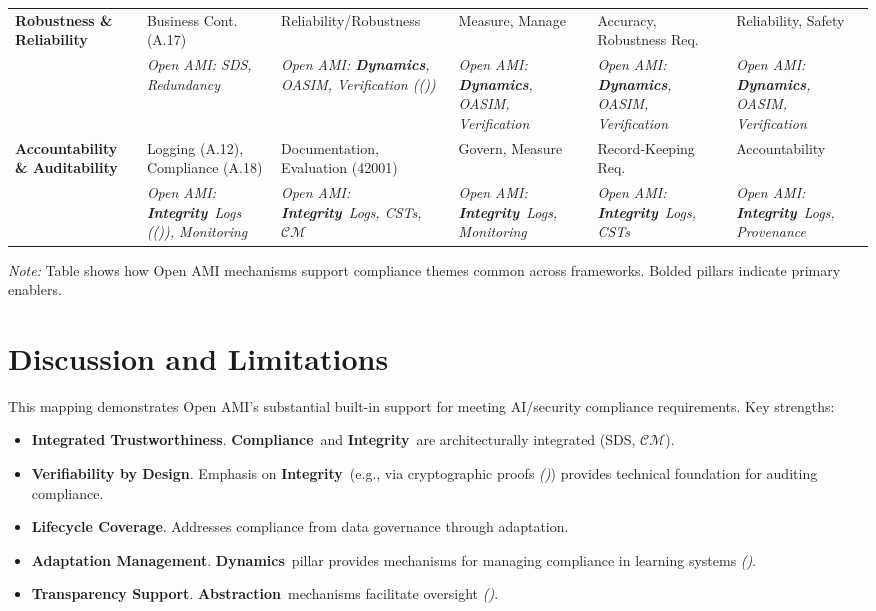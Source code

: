 \documentclass[12pt,a4paper]{report}
\renewcommand{\citep}[1]{\textit{\scriptsize{(\cite{#1})}}}
\newcommand{\Compliance}{\textbf{Compliance}}
\newcommand{\Integrity}{\textbf{Integrity}}
\newcommand{\Abstraction}{\textbf{Abstraction}}
\newcommand{\Dynamics}{\textbf{Dynamics}}
\begin{document}
\begin{table}[htbp]
{\begin{tabular}{p{2.5cm}|p{2.5cm}|p{2.5cm}|p{2.5cm}|p{2.5cm}|p{2.5cm}@{}}
				\midrule
				\textbf{Robustness \& Reliability} & \scriptsize Business Cont. (A.17) & \scriptsize Reliability/Robustness & \scriptsize Measure, Manage & \scriptsize Accuracy, Robustness Req. & \scriptsize Reliability, Safety \\
				& \textit{\scriptsize Open AMI: SDS, Redundancy} & \textit{\scriptsize Open AMI: \Dynamics, OASIM, Verification (\citep{AdditionalCitationRef53})} & \textit{\scriptsize Open AMI: \Dynamics, OASIM, Verification} & \textit{\scriptsize Open AMI: \Dynamics, OASIM, Verification} & \textit{\scriptsize Open AMI: \Dynamics, OASIM, Verification} \\
				\midrule
				\textbf{Accountability \& Auditability} & \scriptsize Logging (A.12), Compliance (A.18) & \scriptsize Documentation, Evaluation (42001) & \scriptsize Govern, Measure & \scriptsize Record-Keeping Req. & \scriptsize Accountability \\
				& \textit{\scriptsize Open AMI: \Integrity\ Logs (\citep{ProML_Provenance_2022}), Monitoring} & \textit{\scriptsize Open AMI: \Integrity\ Logs, CSTs, $\mathcal{CM}$} & \textit{\scriptsize Open AMI: \Integrity\ Logs, Monitoring} & \textit{\scriptsize Open AMI: \Integrity\ Logs, CSTs} & \textit{\scriptsize Open AMI: \Integrity\ Logs, Provenance} \\
				\bottomrule
			\end{tabular}
		} %
		\vspace{0.5ex}
		\centerline{\textit{Note:} Table shows how Open AMI mechanisms support compliance themes common across frameworks. Bolded pillars indicate primary enablers.}
	\end{table}
	
	\section{Discussion and Limitations}
	\label{app:compmap_discussion}
	
	This mapping demonstrates Open AMI's substantial built-in support for meeting AI/security compliance requirements. Key strengths:
	
	\begin{itemize}
		\item \textbf{Integrated Trustworthiness}. \Compliance\ and \Integrity\ are architecturally integrated (SDS, $\mathcal{CM}$).
		\item \textbf{Verifiability by Design}. Emphasis on \Integrity\ (e.g., via cryptographic proofs \citep{Peng2025ZKMLSurvey}) provides technical foundation for auditing compliance.
		\item \textbf{Lifecycle Coverage}. Addresses compliance from data governance through adaptation.
		\item \textbf{Adaptation Management}. \Dynamics\ pillar provides mechanisms for managing compliance in learning systems \citep{Wang2024ContinualLearningSurvey}.
		\item \textbf{Transparency Support}. \Abstraction\ mechanisms facilitate oversight \citep{Crossing_Principle_Practice_Gap_2024}.
	\end{itemize}
	
\end{document}
